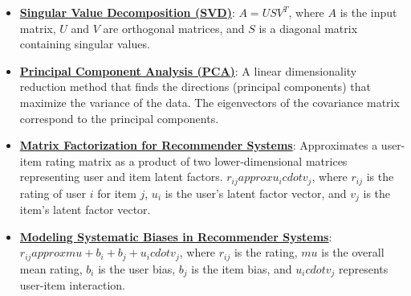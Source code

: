 \documentclass{article}%
\begin{document}
\begin{itemize}[leftmargin=*]%
\item \href{https://purdue.brightspace.com/d2l/common/assets/pdfjs-d2l-dist/1.0.14-legacy/web/viewer.html?file=\%2Fcontent\%2Fenforced\%2F1095467-wl.202510.CS.24300.001\%2F11L2-svd-pca-recommender.pdf\%3Fou\%3D1095467\&lang=en-us\&container=d2l-fileviewer-rendered-pdf\&fullscreen=d2l-fileviewer-rendered-pdf-dialog\&height=667#page=10}{\textbf{Singular Value Decomposition (SVD)}}: $A = USV^T$, where $A$ is the input matrix, $U$ and $V$ are orthogonal matrices, and $S$ is a diagonal matrix containing singular values.%
\item \href{https://purdue.brightspace.com/d2l/common/assets/pdfjs-d2l-dist/1.0.14-legacy/web/viewer.html?file=\%2Fcontent\%2Fenforced\%2F1095467-wl.202510.CS.24300.001\%2F11L2-svd-pca-recommender.pdf\%3Fou\%3D1095467\&lang=en-us\&container=d2l-fileviewer-rendered-pdf\&fullscreen=d2l-fileviewer-rendered-pdf-dialog\&height=667#page=17}{\textbf{Principal Component Analysis (PCA)}}: A linear dimensionality reduction method that finds the directions (principal components) that maximize the variance of the data. The eigenvectors of the covariance matrix correspond to the principal components.%
\item \href{https://purdue.brightspace.com/d2l/common/assets/pdfjs-d2l-dist/1.0.14-legacy/web/viewer.html?file=\%2Fcontent\%2Fenforced\%2F1095467-wl.202510.CS.24300.001\%2F11L2-svd-pca-recommender.pdf\%3Fou\%3D1095467\&lang=en-us\&container=d2l-fileviewer-rendered-pdf\&fullscreen=d2l-fileviewer-rendered-pdf-dialog\&height=667#page=36}{\textbf{Matrix Factorization for Recommender Systems}}: Approximates a user-item rating matrix as a product of two lower-dimensional matrices representing user and item latent factors. $r_{ij}  approx u_i  cdot v_j$, where $r_{ij}$ is the rating of user $i$ for item $j$, $u_i$ is the user's latent factor vector, and $v_j$ is the item's latent factor vector.%
\item \href{https://purdue.brightspace.com/d2l/common/assets/pdfjs-d2l-dist/1.0.14-legacy/web/viewer.html?file=\%2Fcontent\%2Fenforced\%2F1095467-wl.202510.CS.24300.001\%2F11L2-svd-pca-recommender.pdf\%3Fou\%3D1095467\&lang=en-us\&container=d2l-fileviewer-rendered-pdf\&fullscreen=d2l-fileviewer-rendered-pdf-dialog\&height=667#page=44}{\textbf{Modeling Systematic Biases in Recommender Systems}}: $r_{ij}  approx  mu + b_i + b_j + u_i  cdot v_j$, where $r_{ij}$ is the rating, $ mu$ is the overall mean rating, $b_i$ is the user bias, $b_j$ is the item bias, and $u_i  cdot v_j$ represents user-item interaction.%
\end{itemize}%
\end{document}
